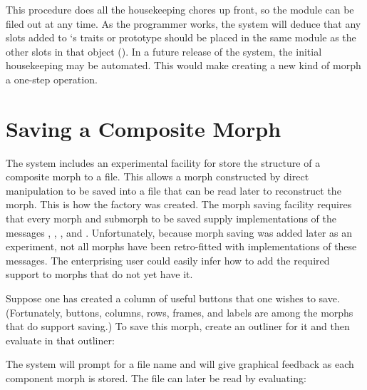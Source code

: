 \documentclass[letterpaper,10pt,english]{sphinxmanual}
\begin{document}
This procedure does all the housekeeping chores up front, so the module can be filed out at any time. As the programmer works, the system will deduce that any slots added to `s traits or prototype should be placed in the same module as the other slots in that object (). In a future release of the system, the initial housekeeping may be automated. This would make creating a new kind of morph a one-step operation.


\section{Saving a Composite Morph}
\label{\detokenize{morphic:saving-a-composite-morph}}
The system includes an experimental facility for store the structure of a composite morph to a file. This allows a morph constructed by direct manipulation to be saved into a file that can be read later to reconstruct the morph. This is how the \sphinxquotedblleft{}factory\sphinxquotedblright{} was created. The morph saving facility requires that every morph and submorph to be saved supply implementations of the messages , , , and . Unfortunately, because morph saving was added later as an experiment, not all morphs have been retro-fitted with implementations of these messages. The enterprising user could easily infer how to add the required support to morphs that do not yet have it.

Suppose one has created a column of useful buttons that one wishes to save. (Fortunately, buttons, columns, rows, frames, and labels are among the morphs that do support saving.) To save this morph, create an outliner for it and then evaluate in that outliner:

\begin{sphinxVerbatim}[commandchars=\\\{\}]
\end{sphinxVerbatim}

The system will prompt for a file name and will give graphical feedback as each component morph is stored. The file can later be read by evaluating:

\begin{sphinxVerbatim}[commandchars=\\\{\}]
 
\end{sphinxVerbatim}
\end{document}
